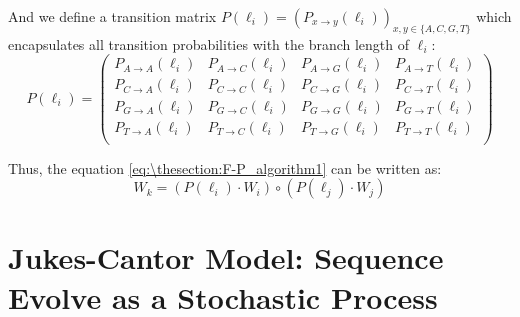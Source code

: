 \documentclass[12pt]{book}
\begin{document}
        And we define a transition matrix $P(\ell_i) = \left( P_{x \rightarrow y}(\ell_i) \right)_{x,y \in \{ A,C,G,T \}}$ which encapsulates all transition probabilities with the branch length of $\ell_i$:
        \begin{equation*}
            P(\ell_i) = \left(
                \begin{matrix}
                    P_{A \rightarrow A}(\ell_i) & P_{A \rightarrow C}(\ell_i) & P_{A \rightarrow G}(\ell_i) & P_{A \rightarrow T}(\ell_i) \\
                    P_{C \rightarrow A}(\ell_i) & P_{C \rightarrow C}(\ell_i) & P_{C \rightarrow G}(\ell_i) & P_{C \rightarrow T}(\ell_i) \\
                    P_{G \rightarrow A}(\ell_i) & P_{G \rightarrow C}(\ell_i) & P_{G \rightarrow G}(\ell_i) & P_{G \rightarrow T}(\ell_i) \\
                    P_{T \rightarrow A}(\ell_i) & P_{T \rightarrow C}(\ell_i) & P_{T \rightarrow G}(\ell_i) & P_{T \rightarrow T}(\ell_i) \\
                \end{matrix}
            \right)
        \end{equation*}

        Thus, the equation \eqref{eq:\thesection:F-P_algorithm1} can be written as:
        \begin{equation}
            W_k = \left( P(\ell_i) \cdot W_i \right) \circ \left( P(\ell_j) \cdot W_j \right)
        \end{equation}

    \section{Jukes-Cantor Model: Sequence Evolve as a Stochastic Process}
\end{document}
